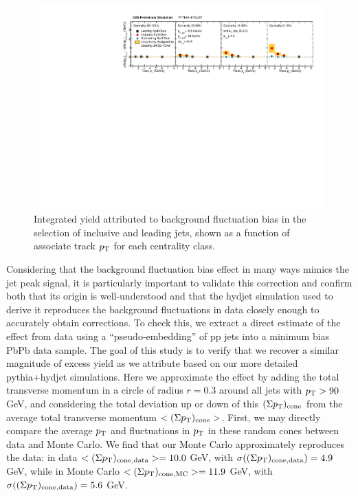        
                  \begin{figure}[h!]
                  \begin{center}\includegraphics[width=0.99\textwidth]{figures/JFF_SpillOver/Integral_Closure_pT_Leading.pdf}
                  \caption[Integrated yield attributed to background fluctuation bias as a function of $p_{\rm T}^{\rm trk}$]{Integrated yield attributed to background fluctuation bias in the selection of inclusive and leading jets, shown as a function of associate track $p_{\rm T}$ for each centrality class.}
                    \label{fig:closure_integrals_pT}
                    \end{center}
                    \end{figure}
                    

Considering that the background fluctuation bias effect in many ways mimics the jet peak signal, it is particularly important to validate this correction and confirm both that its origin is well-understood and that the {\sc hydjet} simulation used to derive it reproduces the background fluctuations in data closely enough to accurately obtain corrections.  To check this, we extract a direct estimate of the effect from data using a ``pseudo-embedding'' of pp jets into a minimum bias PbPb data sample.  The goal of this study is to verify that we recover a similar magnitude of excess yield as we attribute based on our more detailed {\sc pythia+hydjet} simulations.  Here we approximate the effect by adding the total transverse momentum in a circle of radius  $r = 0.3$ around all jets with $p_{\rm T} > 90$ GeV, and considering the total deviation up or down of this $(\Sigma p_{\rm T})_{\rm cone}$ from the average total transverse momentum $< (\Sigma p_{\rm T})_{\rm cone}>$.  First, we may directly compare the average $p_{\rm T}$ and fluctuations in $p_{\rm T}$ in these random cones between data and Monte Carlo.  We find that our Monte Carlo approximately reproduces the data:  in data $< (\Sigma p_{\rm T})_{\rm cone, data}> = 10.0$ GeV, with $\sigma((\Sigma p_{\rm T})_{\rm cone, data}) = 4.9$ GeV, while in Monte Carlo $< (\Sigma p_{\rm T})_{\rm cone, MC}> = 11.9$ GeV, with $\sigma((\Sigma p_{\rm T})_{\rm cone, data}) = 5.6$ GeV. 

